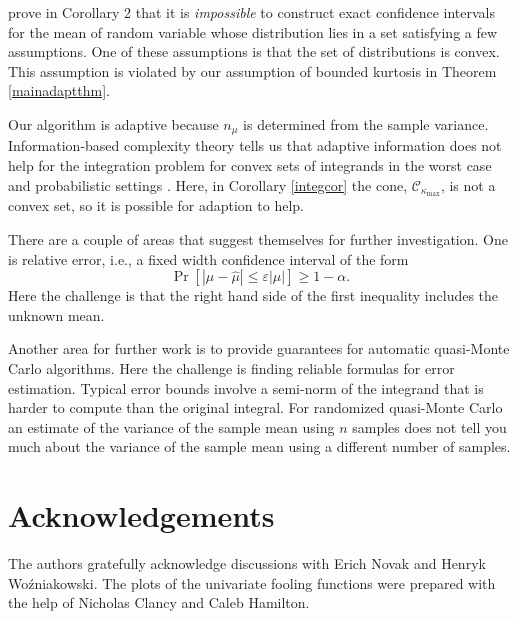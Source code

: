 \documentclass[graybox]{svmult}
\newcommand{\abs}[1]{\left|#1\right|}
\newcommand{\hmu}{\hat{\mu}}
\newcommand{\cc}{\mathcal{C}}
\def\abs#1{\ensuremath{\left \lvert #1 \right \rvert}}
\begin{document}
\cite{BahSav56} prove in Corollary 2 that it is \emph{impossible} to construct exact confidence intervals for the mean of random variable whose distribution lies in a set satisfying a few assumptions. One of these assumptions is that the set of distributions is convex.  This assumption is violated by our assumption of bounded kurtosis in Theorem \ref{mainadaptthm}. 

Our algorithm is adaptive because $n_\mu$ is determined from the sample variance.  Information-based complexity theory tells us that adaptive information does not help for the integration problem for convex sets of integrands in the worst case and probabilistic settings \citep[Chapter 4, Theorem 5.2.1; Chapter 8, Corollary 5.3.1]{TraWasWoz88}.  Here, in Corollary \ref{integcor} the cone, $\cc_{\kappa_{\max}}$, is not a convex set, so it is possible for adaption to help.

There are a couple of areas that suggest themselves for further investigation.  One is relative error, i.e., a fixed width confidence interval of the form 
\[
\Pr[\abs{\mu-\hmu} \le \varepsilon \abs{\mu}] \ge 1-\alpha.
\]
Here the challenge is that the right hand side of the first inequality includes the unknown mean.

Another area for further work is to provide guarantees for automatic quasi-Monte Carlo algorithms. Here the challenge is finding reliable formulas for error estimation.  Typical error bounds involve a semi-norm of the integrand that is harder to compute than the original integral.  For randomized quasi-Monte Carlo an estimate of the variance of the sample mean using $n$ samples does not tell you much about the variance of the sample mean using a different number of samples.


\section*{Acknowledgements} The authors gratefully acknowledge discussions with Erich Novak and Henryk Wo\'zniakowski.  The plots of the univariate fooling functions were prepared with the help of Nicholas Clancy and Caleb Hamilton.



\end{document}
